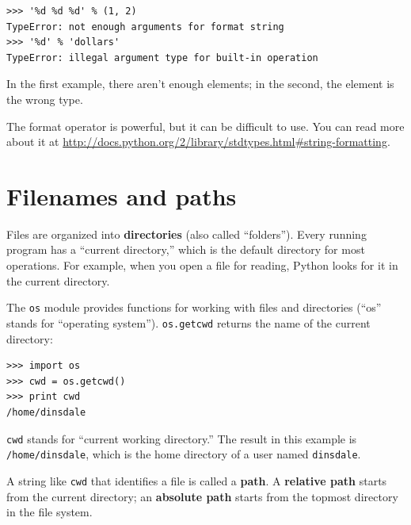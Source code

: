 \documentclass[10pt]{book}
\begin{document}
\begin{verbatim}
>>> '%d %d %d' % (1, 2)
TypeError: not enough arguments for format string
>>> '%d' % 'dollars'
TypeError: illegal argument type for built-in operation
\end{verbatim}
%
In the first example, there aren't enough elements; in the
second, the element is the wrong type.

The format operator is powerful, but it can be difficult to use.  You
can read more about it at
\url{http://docs.python.org/2/library/stdtypes.html#string-formatting}.




\section{Filenames and paths}
\label{paths}

Files are organized into {\bf directories} (also called ``folders'').
Every running program has a ``current directory,'' which is the
default directory for most operations.  
For example, when you open a file for reading, Python looks for it in the
current directory.

The {\tt os} module provides functions for working with files and
directories (``os'' stands for ``operating system'').  {\tt os.getcwd}
returns the name of the current directory:

\begin{verbatim}
>>> import os
>>> cwd = os.getcwd()
>>> print cwd
/home/dinsdale
\end{verbatim}
%
{\tt cwd} stands for ``current working directory.''  The result in
this example is {\tt /home/dinsdale}, which is the home directory of a
user named {\tt dinsdale}.

A string like {\tt cwd} that identifies a file is called a {\bf path}.
A {\bf relative path} starts from the current directory;
an {\bf absolute path} starts from the topmost directory in the
file system.
\end{document}
